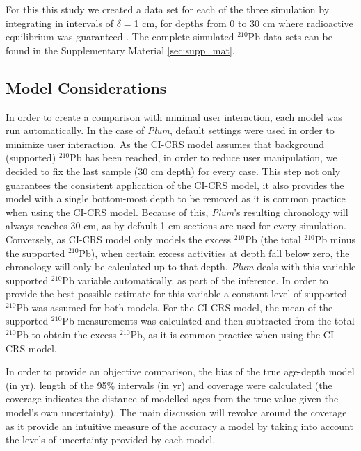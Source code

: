 \documentclass [10pt] {article}
\begin{document}
For this this study we created a data set for each of the three simulation by integrating in intervals of $\delta =$1 cm, for depths from  0 to 30 cm where radioactive equilibrium was guaranteed \citep{Aquino2018}.
The complete simulated $^{210}$Pb data sets can be found in the Supplementary Material \ref{sec:supp_mat}.

\subsection{Model Considerations}
In order to create a comparison with minimal user interaction, each model was run automatically.
In the case of \textit{Plum}, default settings were used in order to minimize user interaction.
As the CI-CRS model assumes that background (supported) $^{210}$Pb has been reached, in order to reduce user manipulation, we decided to fix the last sample (30 cm depth) for every case.
This step not only guarantees the consistent application of the CI-CRS model, it also provides the model with a single bottom-most depth to be removed as it is common practice when using the CI-CRS model.
Because of this, \textit{Plum}'s resulting chronology will always reaches 30 cm, as by default 1 cm sections are used for every simulation.
Conversely, as CI-CRS model only models the excess $^{210}$Pb (the total $^{210}$Pb minus the supported $^{210}$Pb), when certain excess activities at depth fall below zero, the chronology will only be calculated up to that depth.
\textit{Plum} deals with this variable supported $^{210}$Pb variable automatically, as part of the inference.
In order to provide the best possible estimate for this variable a constant level of supported $^{210}$Pb was assumed for both models.
For the CI-CRS model, the mean of the supported $^{210}$Pb measurements was calculated and then subtracted from the total $^{210}$Pb to obtain the excess $^{210}$Pb, as it is common practice when using the CI-CRS model.

In order to provide an objective comparison, the bias of the true age-depth model (in yr), length of the 95\% intervals (in yr) and coverage were calculated (the coverage indicates the distance of modelled ages from the true value given the model's own uncertainty). 
The main discussion will revolve around the coverage as it provide an intuitive measure of the accuracy a model by taking into account the levels of uncertainty provided by each model. 

\end{document}
